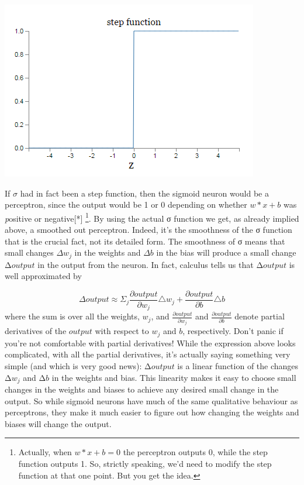 \documentclass[a4paper,12pt]{report}%
\begin{document}
\begin{center}
 \includegraphics[width=0.5\linewidth]{images/step.png}
\end{center}
If $\sigma$ had in fact been a step function, then the sigmoid neuron would be a perceptron, since the output would be 1 or 0 depending on whether $ w*x + b $ was {\emph positive or negative}[*] \footnote{\color{blue}Actually, when $w*x + b = 0 $ the perceptron outputs 0, while the step function outputs 1. So, strictly speaking, we'd need to modify the step function at that one point. But you get the idea.}. By using the actual σ function we get, as already implied above, a smoothed out perceptron. Indeed, it's the smoothness of the σ function that is the crucial fact, not its detailed form. The smoothness of σ means that small changes $Δw_{j}$ in the weights and $Δb$ in the bias will produce a small change Δ$output$ in the output from the neuron. In fact, calculus tells us that Δ$output$ is well approximated by

\begin{equation}
\Delta output \approx  \Sigma_{j} \frac{\partial output}{\partial w_{j}} \triangle w_{j} + \frac{ \partial output}{\partial b} \triangle b
\end{equation}
where the sum is over all the weights, $w_{j}$, and $\frac{\partial output}{\partial w_{j}}$ and $\frac{\partial output}{\partial b}$ denote partial derivatives of the $output$ with respect to $w_{j}$ and $b$, respectively. Don't panic if you're not comfortable with partial derivatives! While the expression above looks complicated, with all the partial derivatives, it's actually saying something very simple (and which is very good news): Δ$output$ is a linear function of the changes Δ$w_{j}$ and Δ$b$ in the weights and bias. This linearity makes it easy to choose small changes in the weights and biases to achieve any desired small change in the output. So while sigmoid neurons have much of the same qualitative behaviour as perceptrons, they make it much easier to figure out how changing the weights and biases will change the output.
\end{document}
